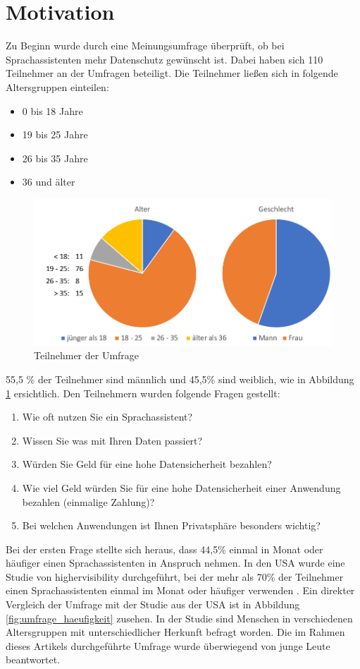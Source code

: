 \section{Motivation}\label{sec:motivaiton}
Zu Beginn wurde durch eine Meinungsumfrage überprüft, ob bei Sprachassistenten mehr Datenschutz gewünscht ist. Dabei haben sich 110 Teilnehmer an der Umfragen beteiligt. Die Teilnehmer ließen sich in folgende Altersgruppen einteilen:
\begin{itemize}
	\item 0 bis 18 Jahre 
	\item 19 bis 25 Jahre
	\item 26 bis 35 Jahre
	\item 36 und älter	
\end{itemize}

\begin{figure}[h!]
	\centering
	\includegraphics[width=0.7\linewidth]{Picture/umfrage_teilnehmer}
	\caption[Teilnehmer der Umfrage]{Teilnehmer der Umfrage}
	\label{fig:umfrage_teilnehmer}
\end{figure}

55,5 \% der Teilnehmer sind männlich und 45,5\% sind weiblich, wie in Abbildung \ref{fig:umfrage_teilnehmer} ersichtlich. Den Teilnehmern wurden folgende Fragen gestellt:

\begin{enumerate}	
	\item Wie oft nutzen Sie ein Sprachassistent?
	\item Wissen Sie was mit Ihren Daten passiert?
	\item Würden Sie Geld für eine hohe Datensicherheit bezahlen?
	\item Wie viel Geld würden Sie für eine hohe Datensicherheit einer Anwendung bezahlen (einmalige Zahlung)?
	\item Bei welchen Anwendungen ist Ihnen Privatsphäre besonders wichtig?	
\end{enumerate}

Bei der ersten Frage stellte sich heraus, dass 44,5\% einmal in Monat oder häufiger einen Sprachassistenten in Anspruch nehmen. In den USA wurde eine Studie von \glqq highervisibility\grqq{} durchgeführt, bei der mehr als 70\% der Teilnehmer einen Sprachassistenten einmal im Monat oder häufiger verwenden \cite{highervisibility}.
Ein direkter Vergleich der Umfrage mit der Studie aus der USA ist in Abbildung \ref{fig:umfrage_haeufigkeit} zusehen. In der Studie sind Menschen in verschiedenen Altersgruppen mit unterschiedlicher Herkunft befragt worden. Die im Rahmen dieses Artikels durchgeführte Umfrage wurde überwiegend von junge Leute beantwortet.

